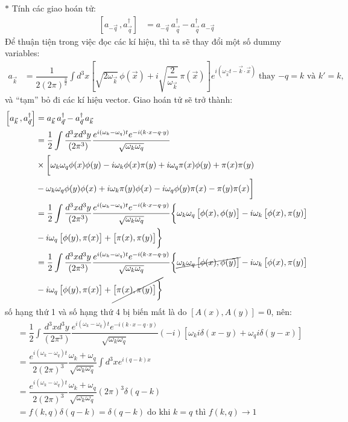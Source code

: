 \documentclass{report}
\begin{document}
$\ast$ Tính các giao hoán tử:
\begin{align*}
	\left[	a_{-\vec{q}} \,, a_{\vec{q}}^{\dagger}\right] &= a_{-\vec{q}}\, a_{\vec{q}}^{\dagger} - a_{\vec{q}}^{\dagger}\, a_{-\vec{q}}
\end{align*}
Để thuận tiện trong việc đọc các kí hiệu, thì ta sẽ thay đổi một số dummy variables:
\begin{align*}
	a_{\vec{k}} &= \dfrac{1}{2(2\pi)^\frac{3}{2} }  \displaystyle \int d^3x \left[\sqrt{2\omega_{\vec{k}}}\,\phi(\vec{x}) + i\sqrt{\dfrac{2}{\omega_{\vec{k}}}}\,\pi(\vec{x})\right] e^{i(\omega_{\vec{k}}t - \vec{k}\cdot\vec{x})}\;\text{thay $-q = k$ và $k' = k$},
\end{align*}
và ``tạm'' bỏ đi các kí hiệu vector. Giao hoán tử sẽ trở thành:
\begin{align*}
	\left[	a_{\vec{k}} \,, a_{\vec{q}}^{\dagger}\right] 
	&= a_{\vec{k}}\, a_{\vec{q}}^{\dagger} - a_{\vec{q}}^{\dagger}\, a_{\vec{k}}\\
	&= \dfrac{1}{2} \int \dfrac{d^3xd^3y}{(2\pi^3)}\dfrac{e^{i(\omega_k - \omega_q)t} e^{-i(k\cdot x - q\cdot y)}}{\sqrt{\omega_k\omega_q}}  \\
	&\times \biggl[ \omega_k \omega_q \phi(x)\phi(y) - i\omega_k\phi(x)\pi(y) + i\omega_q\pi(x)\phi(y) + \pi(x)\pi(y) \\
	&- \omega_k \omega_q\phi(y)\phi(x) + i\omega_k\pi(y)\phi(x) - i\omega_q\phi(y)\pi(x) - \pi(y)\pi(x) \biggr]\\
	& = \dfrac{1}{2} \int \dfrac{d^3xd^3y}{(2\pi^3)}\dfrac{e^{i(\omega_k - \omega_q)t} e^{-i(k\cdot x - q\cdot y)}}{\sqrt{\omega_k\omega_q}}\biggl\{ \omega_k\omega_q\left[ \phi(x),\phi(y) \right] - i\omega_k\left[\phi(x),\pi(y)\right]\\
	&- i\omega_q\left[\phi(y),\pi(x)\right] + \left[ \pi(x),\pi(y) \right] \biggr\}\\
	& = \dfrac{1}{2} \int \dfrac{d^3xd^3y}{(2\pi^3)}\dfrac{e^{i(\omega_k - \omega_q)t} e^{-i(k\cdot x - q\cdot y)}}{\sqrt{\omega_k\omega_q}}\biggl\{ \cancel{\omega_k\omega_q\left[ \phi(x),\phi(y) \right]} - i\omega_k\left[\phi(x),\pi(y)\right]\\
	&- i\omega_q\left[\phi(y),\pi(x)\right] + \cancel{\left[ \pi(x),\pi(y) \right] \biggr\}}
\end{align*}
số hạng thứ 1 và số hạng thứ 4 bị biến mất là do $\left[A(x),A(y)\right] = 0$, nên:
\begin{align*}
	& = \dfrac{1}{2} \int \dfrac{d^3xd^3y}{(2\pi^3)}\dfrac{e^{i(\omega_k - \omega_q)t} e^{-i(k\cdot x - q\cdot y)}}{\sqrt{\omega_k\omega_q}} (-i)\left[\omega_k i \delta(x-y) + \omega_q i \delta(y-x)  \right] \\ 
	&= 	\dfrac{e^{i(\omega_k - \omega_q)t}}{2(2\pi)^3} \dfrac{\omega_k + \omega_q}{\sqrt{\omega_k\omega_q}} \int d^3x e^{i(q-k)x}\\
	&= 	\dfrac{e^{i(\omega_k - \omega_q)t}}{2(2\pi)^3} \dfrac{\omega_k + \omega_q}{\sqrt{\omega_k\omega_q}} (2\pi)^3 \delta(q-k)\\
	&= f(k,q)\delta(q-k ) = \delta(q-k) \; \text{do khi $k=q$ thì $f(k,q) \rightarrow 1$ }
\end{align*}
\end{document}
